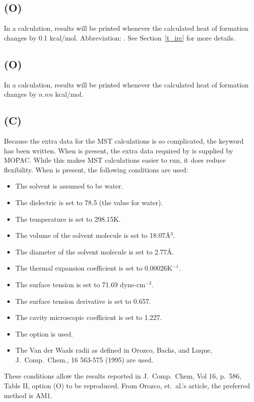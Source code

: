 \subsection*{ (O)}
In  a    calculation,  results  will  be  printed  whenever   the
calculated  heat  of  formation  changes by 0.1 kcal/mol.  Abbreviation:
. See Section~\ref{t_irc}
for more details.

\subsection*{ (O)}
In  a    calculation,  results  will  be  printed  whenever   the
calculated heat of formation changes by $n.nn$ kcal/mol.

\subsection*{ (C)}
Because the extra data for the MST calculations is so complicated, the keyword
 has been written.  When  is present, the extra data required
by  is supplied by MOPAC.  While this makes MST calculations easier
to run, it does reduce flexibility.  When  is present, the following
conditions are used:
\begin{itemize}
\item The solvent is assumed to be water.
\item The dielectric is set to 78.5 (the value for water).
\item The temperature is set to 298.15K.
\item The volume of the solvent molecule is set to 18.07\AA $^3$.
\item The diameter of the solvent molecule is set to 2.77\AA .
\item The thermal expansion coefficient is set to 0.00026K$^{-1}$.
\item The surface tension is set to 71.69 dyne-cm$^{-2}$.
\item The surface tension derivative is set to 0.657.
\item The cavity microscopic coefficient is set to 1.227.
\item The  option is used.
\item The Van der Waals radii as defined in Orozco, Bachs, and Luque, J.\ Comp.\
Chem., 16 563-575 (1995) are used.
\end{itemize}
These conditions allow the results reported in J.\ Comp.\ Chem, Vol 16, p.~586,
Table II, option (O) to be reproduced.  From Orozco, et.\ al.'s article, the
preferred method is AM1.

